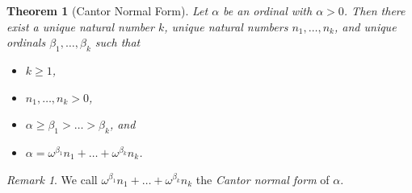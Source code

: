 \documentclass[a4paper,11pt]{article}
\theoremstyle{plain}
\newtheorem{thm}{Theorem}[subsection]
\theoremstyle{definition}
\theoremstyle{remark}
\newtheorem*{rem}{Remark}
\begin{document}
\begin{thm}[Cantor Normal Form]
\label{thm:CantorNormalForm}
Let $\alpha$ be an ordinal with $\alpha > 0$. Then there exist a unique natural number $k$, unique natural numbers $n_1,\dots, n_k$, and unique ordinals $\beta_1,\dots,\beta_k$ such that 
\begin{itemize}
\item $k \geq 1$,
\item $n_1, \dots, n_k > 0$,
\item $\alpha \geq \beta_1 > \dots > \beta_k$, and
\item $\alpha = \omega^{\beta_1}n_1 + \dots + \omega^{\beta_k}n_k$.
\end{itemize}
\end{thm}
\begin{rem}
We call $\omega^{\beta_1}n_1 + \dots + \omega^{\beta_k}n_k$ the \textit{Cantor normal form} of $\alpha$.
\end{rem}
\end{document}
